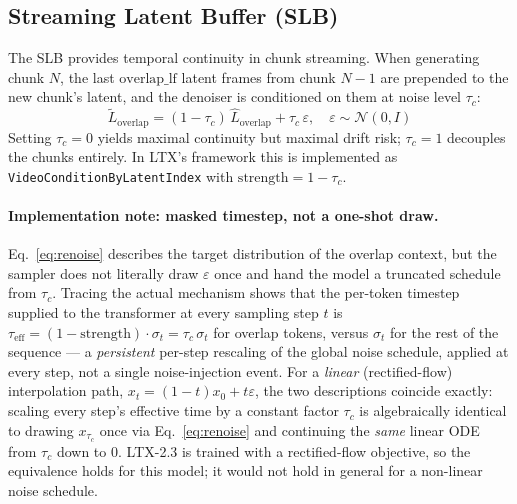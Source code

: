 \documentclass[12pt]{article}
\begin{document}
\subsection{Streaming Latent Buffer (SLB)}
The SLB provides temporal continuity in chunk streaming.  When generating
chunk $N$, the last $\text{overlap\_lf}$ latent frames from chunk $N-1$ are
prepended to the new chunk's latent, and the denoiser is conditioned on them
at noise level $\tau_c$:
\begin{equation}
\tilde{L}_{\text{overlap}} = (1-\tau_c)\,\hat{L}_{\text{overlap}} + \tau_c\,\varepsilon,
\quad \varepsilon \sim \mathcal{N}(0, I)
\label{eq:renoise}
\end{equation}
Setting $\tau_c=0$ yields maximal continuity but maximal drift risk;
$\tau_c=1$ decouples the chunks entirely.  In LTX's framework this is
implemented as \texttt{VideoConditionByLatentIndex} with
$\text{strength}=1-\tau_c$.

\paragraph{Implementation note: masked timestep, not a one-shot draw.}
Eq.~\eqref{eq:renoise} describes the target distribution of the overlap
context, but the sampler does not literally draw $\varepsilon$ once and hand
the model a truncated schedule from $\tau_c$.  Tracing the actual mechanism
shows that the per-token timestep supplied to the transformer at every
sampling step $t$ is $\tau_{\text{eff}} = (1-\text{strength})\cdot\sigma_t
= \tau_c\,\sigma_t$ for overlap tokens, versus $\sigma_t$ for the rest of the
sequence --- a \emph{persistent} per-step rescaling of the global noise
schedule, applied at every step, not a single noise-injection event.  For a
\emph{linear} (rectified-flow) interpolation path,
$x_t = (1-t)x_0 + t\varepsilon$, the two descriptions coincide exactly:
scaling every step's effective time by a constant factor $\tau_c$ is
algebraically identical to drawing $x_{\tau_c}$ once via
Eq.~\eqref{eq:renoise} and continuing the \emph{same} linear ODE from
$\tau_c$ down to $0$.  LTX-2.3 is trained with a rectified-flow objective, so
the equivalence holds for this model; it would not hold in general for a
non-linear noise schedule.
\end{document}
